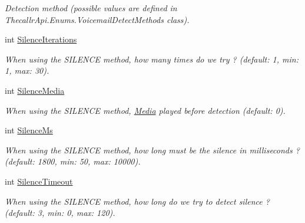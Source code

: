 \begin{DoxyCompactItemize}
\begin{DoxyCompactList}\small\item\em Detection method (possible values are defined in Thecallr\+Api.\+Enums.\+Voicemail\+Detect\+Methods class). \end{DoxyCompactList}\item 
int \hyperlink{class_thecallr_api_1_1_objects_1_1_app_1_1_param_1_1_vms_detect_a7bf53cbf9be9fc92cc236f75da7f0139}{Silence\+Iterations}
\begin{DoxyCompactList}\small\item\em When using the S\+I\+L\+E\+N\+C\+E method, how many times do we try ? (default\+: 1, min\+: 1, max\+: 30). \end{DoxyCompactList}\item 
int \hyperlink{class_thecallr_api_1_1_objects_1_1_app_1_1_param_1_1_vms_detect_af0ccbdf3ad24b0e07f7846c32043b0c5}{Silence\+Media}
\begin{DoxyCompactList}\small\item\em When using the S\+I\+L\+E\+N\+C\+E method, \hyperlink{namespace_thecallr_api_1_1_objects_1_1_media}{Media} played before detection (default\+: 0). \end{DoxyCompactList}\item 
int \hyperlink{class_thecallr_api_1_1_objects_1_1_app_1_1_param_1_1_vms_detect_a7731378e9d2b84dc901266a9d03639a5}{Silence\+Ms}
\begin{DoxyCompactList}\small\item\em When using the S\+I\+L\+E\+N\+C\+E method, how long must be the silence in milliseconds ? (default\+: 1800, min\+: 50, max\+: 10000). \end{DoxyCompactList}\item 
int \hyperlink{class_thecallr_api_1_1_objects_1_1_app_1_1_param_1_1_vms_detect_a6c1c058d7dd3b3a64c70fee7e21e38a4}{Silence\+Timeout}
\begin{DoxyCompactList}\small\item\em When using the S\+I\+L\+E\+N\+C\+E method, how long do we try to detect silence ? (default\+: 3, min\+: 0, max\+: 120). \end{DoxyCompactList}\end{DoxyCompactItemize}


